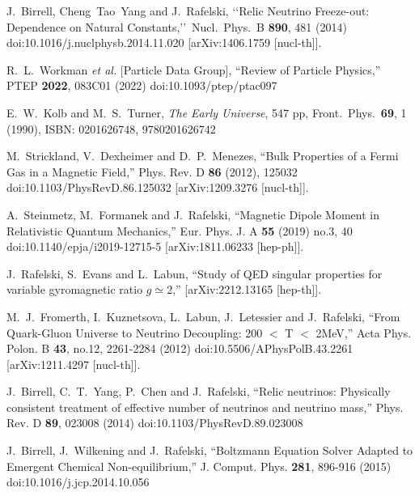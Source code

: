 \documentclass[Universe,article,submit,moreauthors,pdftex]{Definitions/mdpi}
\begin{document}
\begin{thebibliography}{99}
 J.~Birrell, Cheng~Tao~Yang and J.~Rafelski,
\lq\lq Relic Neutrino Freeze-out: Dependence on Natural Constants,\rq\rq\
 Nucl.\ Phys.\ B {\bf 890}, 481 (2014)
 doi:10.1016/j.nuclphysb.2014.11.020
 [arXiv:1406.1759 [nucl-th]].


R.~L.~Workman \textit{et al.} [Particle Data Group],
``Review of Particle Physics,''
PTEP \textbf{2022}, 083C01 (2022)
doi:10.1093/ptep/ptac097

E.~W.~Kolb and M.~S.~Turner,
\emph{The Early Universe},
547 pp, Front.\ Phys.\ {\bf 69}, 1 (1990),
ISBN: 0201626748, 9780201626742

M.~Strickland, V.~Dexheimer and D.~P.~Menezes,
``Bulk Properties of a Fermi Gas in a Magnetic Field,''
Phys. Rev. D \textbf{86} (2012), 125032
doi:10.1103/PhysRevD.86.125032
[arXiv:1209.3276 [nucl-th]].

A.~Steinmetz, M.~Formanek and J.~Rafelski,
``Magnetic Dipole Moment in Relativistic Quantum Mechanics,''
Eur. Phys. J. A \textbf{55} (2019) no.3, 40
doi:10.1140/epja/i2019-12715-5
[arXiv:1811.06233 [hep-ph]].

J.~Rafelski, S.~Evans and L.~Labun,
``Study of QED singular properties for variable gyromagnetic ratio $g\simeq 2$,''
[arXiv:2212.13165 [hep-th]].


M.~J.~Fromerth, I.~Kuznetsova, L.~Labun, J.~Letessier and J.~Rafelski,
``From Quark-Gluon Universe to Neutrino Decoupling: 200 \ensuremath{<} T \ensuremath{<} 2MeV,''
Acta Phys. Polon. B \textbf{43}, no.12, 2261-2284 (2012)
doi:10.5506/APhysPolB.43.2261
[arXiv:1211.4297 [nucl-th]].

J.~Birrell, C.~T.~Yang, P.~Chen and J.~Rafelski,
``Relic neutrinos: Physically consistent treatment of effective number of neutrinos and neutrino mass,''
Phys. Rev. D \textbf{89}, 023008 (2014)
doi:10.1103/PhysRevD.89.023008


J.~Birrell, J.~Wilkening and J.~Rafelski,
``Boltzmann Equation Solver Adapted to Emergent Chemical Non-equilibrium,''
J. Comput. Phys. \textbf{281}, 896-916 (2015)
doi:10.1016/j.jcp.2014.10.056


\end{thebibliography}
\end{document}
